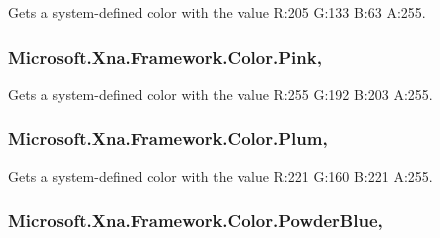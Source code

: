 Gets a system-\/defined color with the value R\+:205 G\+:133 B\+:63 A\+:255.

\hypertarget{struct_microsoft_1_1_xna_1_1_framework_1_1_color_a2ca63ead2de502e2ffb14275c54ac127}{}
\subsubsection[{Pink}]{ Microsoft.\+Xna.\+Framework.\+Color.\+Pink\hspace{0.3cm}{\ttfamily [static]}, {\ttfamily [get]}}\label{struct_microsoft_1_1_xna_1_1_framework_1_1_color_a2ca63ead2de502e2ffb14275c54ac127}


Gets a system-\/defined color with the value R\+:255 G\+:192 B\+:203 A\+:255.

\hypertarget{struct_microsoft_1_1_xna_1_1_framework_1_1_color_a0faca7349305c3a5ba251f72cf5e4416}{}
\subsubsection[{Plum}]{ Microsoft.\+Xna.\+Framework.\+Color.\+Plum\hspace{0.3cm}{\ttfamily [static]}, {\ttfamily [get]}}\label{struct_microsoft_1_1_xna_1_1_framework_1_1_color_a0faca7349305c3a5ba251f72cf5e4416}


Gets a system-\/defined color with the value R\+:221 G\+:160 B\+:221 A\+:255.

\hypertarget{struct_microsoft_1_1_xna_1_1_framework_1_1_color_ac0eb908d8740df4434a60529dc56785a}{}
\subsubsection[{Powder\+Blue}]{ Microsoft.\+Xna.\+Framework.\+Color.\+Powder\+Blue\hspace{0.3cm}{\ttfamily [static]}, {\ttfamily [get]}}\label{struct_microsoft_1_1_xna_1_1_framework_1_1_color_ac0eb908d8740df4434a60529dc56785a}



